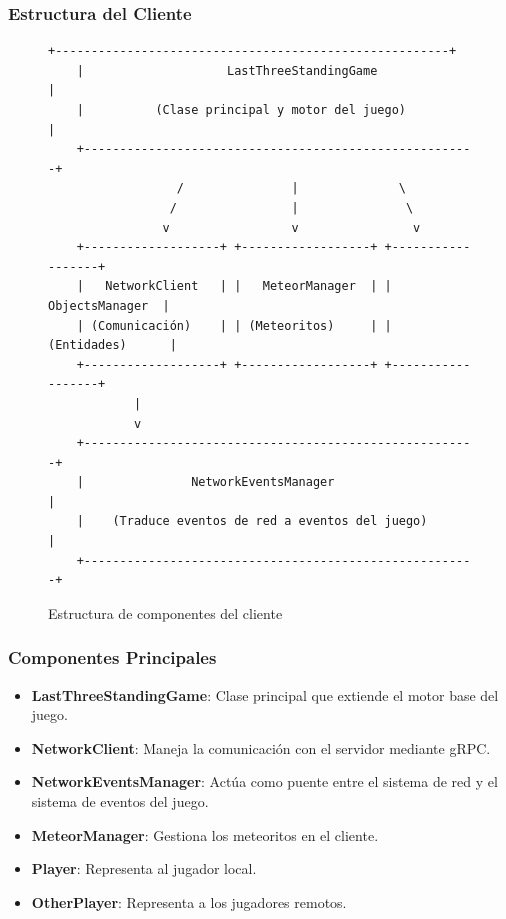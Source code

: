 \documentclass[11pt,letterpaper]{article}
\begin{document}
\subsubsection{Estructura del Cliente}

\begin{figure}[H]
    \centering
    \begin{lstlisting}[language=text]
    +-------------------------------------------------------+
    |                    LastThreeStandingGame              |
    |          (Clase principal y motor del juego)          |
    +-------------------------------------------------------+
                  /               |              \
                 /                |               \
                v                 v                v
    +-------------------+ +------------------+ +------------------+
    |   NetworkClient   | |   MeteorManager  | |  ObjectsManager  |
    | (Comunicación)    | | (Meteoritos)     | | (Entidades)      |
    +-------------------+ +------------------+ +------------------+
            |
            v
    +-------------------------------------------------------+
    |               NetworkEventsManager                    |
    |    (Traduce eventos de red a eventos del juego)       |
    +-------------------------------------------------------+
    \end{lstlisting}
    \caption{Estructura de componentes del cliente}
\end{figure}

\subsubsection{Componentes Principales}

\begin{itemize}
    \item \textbf{LastThreeStandingGame}: Clase principal que extiende el motor base del juego.
    
    \item \textbf{NetworkClient}: Maneja la comunicación con el servidor mediante gRPC.
    
    \item \textbf{NetworkEventsManager}: Actúa como puente entre el sistema de red y el sistema de eventos del juego.
    
    \item \textbf{MeteorManager}: Gestiona los meteoritos en el cliente.
    
    \item \textbf{Player}: Representa al jugador local.
    
    \item \textbf{OtherPlayer}: Representa a los jugadores remotos.
\end{itemize}
\end{document}
